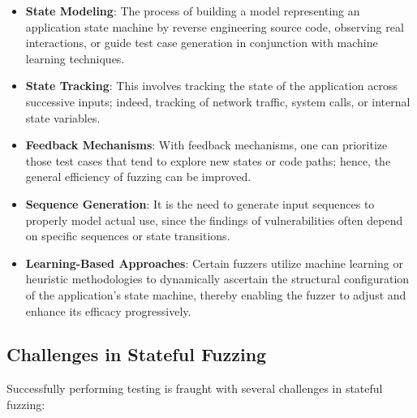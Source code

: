 \begin{itemize}
    \item \textbf{State Modeling}: The process of building a model representing an application state machine by reverse engineering source code, observing real interactions, or guide test case generation in conjunction with machine learning techniques.
    
    \item \textbf{State Tracking}: This involves tracking the state of the application across successive inputs; indeed, tracking of network traffic, system calls, or internal state variables.
    
    \item \textbf{Feedback Mechanisms}: With feedback mechanisms, one can prioritize those test cases that tend to explore new states or code paths; hence, the general efficiency of fuzzing can be improved.
    
    \item \textbf{Sequence Generation}: It is the need to generate input sequences to properly model actual use, since the findings of vulnerabilities often depend on specific sequences or state transitions.
    
    \item \textbf{Learning-Based Approaches}: Certain fuzzers utilize machine learning or heuristic methodologies to dynamically ascertain the structural configuration of the application's state machine, thereby enabling the fuzzer to adjust and enhance its efficacy progressively.
\end{itemize}

\subsection{Challenges in Stateful Fuzzing}
Successfully performing testing is fraught with several challenges in stateful fuzzing:


